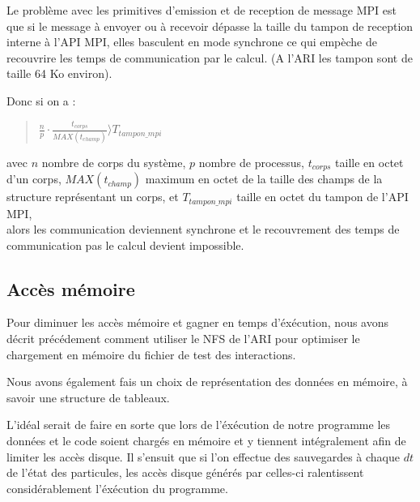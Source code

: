 \par Le problème avec les primitives d'emission et de reception de message MPI est que si le message 
à envoyer ou à recevoir dépasse la taille du tampon de reception interne à l'API MPI,
elles basculent en mode synchrone ce qui empèche de recouvrire les temps de communication
par le calcul. (A l'ARI les tampon sont de taille 64 Ko environ).\\

\par Donc si on a :
\begin{quote}
  \begin{center}
    $\frac{n}{p}\cdot \frac{t_{corps}}{MAX(t_{champ})} \rangle T_{tampon\_mpi}$    
  \end{center}
\end{quote}
avec $n$ nombre de corps du système, $p$ nombre de processus, $t_{corps}$ taille en octet d'un corps,
$MAX(t_{champ})$ maximum en octet de la taille des champs de la structure représentant un corps,
et $T_{tampon\_mpi}$ taille en octet du tampon de l'API MPI,\\
alors les communication deviennent synchrone et le recouvrement des temps de communication pas le calcul devient 
impossible.\\

\subsection{Accès mémoire}

\par Pour diminuer les accès mémoire et gagner en temps d'éxécution, nous avons décrit précédement
comment utiliser le NFS de l'ARI pour optimiser le chargement en mémoire du fichier de test
des interactions.\\

\par Nous avons également fais un choix de représentation des données en mémoire, à savoir une structure 
de tableaux.\\

\par L'idéal serait de faire en sorte que lors de l'éxécution de notre programme les données et le code 
soient chargés en mémoire et y tiennent intégralement afin de limiter les accès disque.
Il s'ensuit que si l'on effectue des sauvegardes à chaque $dt$ de l'état des particules, les 
accès disque générés par celles-ci ralentissent considérablement l'éxécution du programme.\\

